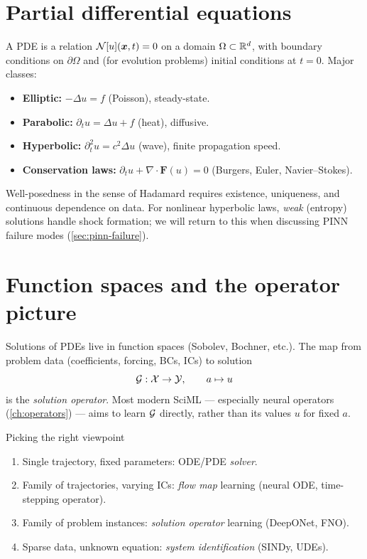 \section{Partial differential equations}
A PDE is a relation
$\mathcal{N}[u](\bm{x},t)=0$ on a domain $\Omega\subset\mathbb{R}^d$, with boundary
conditions on $\partial\Omega$ and (for evolution problems) initial
conditions at $t=0$. Major classes:
\begin{itemize}
\item \textbf{Elliptic:} $-\Delta u=f$ (Poisson), steady-state.
\item \textbf{Parabolic:} $\partial_t u=\Delta u+f$ (heat), diffusive.
\item \textbf{Hyperbolic:} $\partial_t^2 u=c^2\Delta u$ (wave),
finite propagation speed.
\item \textbf{Conservation laws:} $\partial_t u+\nabla\cdot\bm{F}(u)=0$
(Burgers, Euler, Navier--Stokes).
\end{itemize}

Well-posedness in the sense of Hadamard requires existence,
uniqueness, and continuous dependence on data. For nonlinear hyperbolic
laws, \emph{weak} (entropy) solutions handle shock formation; we will
return to this when discussing PINN failure modes
(\cref{sec:pinn-failure}).

\section{Function spaces and the operator picture}
Solutions of PDEs live in function spaces (Sobolev, Bochner, etc.).
The map from problem data (coefficients, forcing, BCs, ICs) to solution
\begin{equation}
\mathcal{G}:\mathcal{X}\to\mathcal{Y},\qquad a\mapsto u
\end{equation}
is the \emph{solution operator}. Most modern SciML --- especially
neural operators (\cref{ch:operators}) --- aims to learn $\mathcal{G}$
directly, rather than its values $u$ for fixed $a$.

\begin{recipe}{Picking the right viewpoint}
\begin{enumerate}
\item Single trajectory, fixed parameters: ODE/PDE \emph{solver}.
\item Family of trajectories, varying ICs: \emph{flow map} learning
(neural ODE, time-stepping operator).
\item Family of problem instances: \emph{solution operator} learning
(DeepONet, FNO).
\item Sparse data, unknown equation: \emph{system identification}
(SINDy, UDEs).
\end{enumerate}
\end{recipe}

